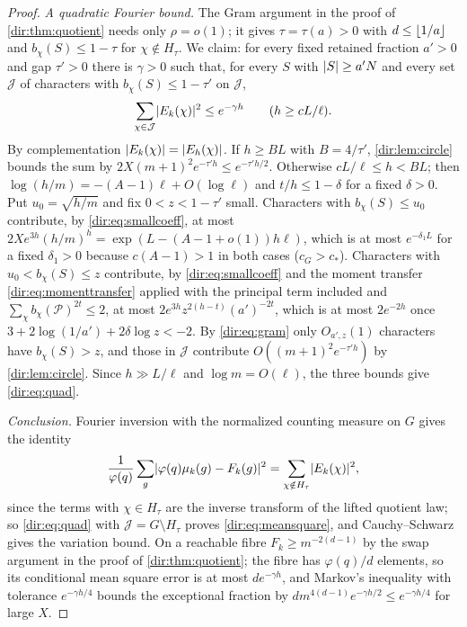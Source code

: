 \begin{proof}
\emph{A quadratic Fourier bound.} The Gram argument in the proof of \cref{dir:thm:quotient} needs only
$\rho=o(1)$; it gives $\tau=\tau(a)>0$ with $d\le\floor{1/a}$ and $b_\chi(S)\le1-\tau$ for
$\chi\notin H_\tau$. We claim: for every fixed retained fraction $a'>0$ and gap $\tau'>0$ there is
$\gamma>0$ such that, for every $S$ with $\abs S\ge a'N$ and every set $\mathcal J$ of characters with
$b_\chi(S)\le1-\tau'$ on $\mathcal J$,
\begin{equation}\label{dir:eq:quad}
 \sum_{\chi\in\mathcal J}\abs{E_k(\chi)}^2\le e^{-\gamma h}\qquad(h\ge cL/\ell).
\end{equation}
By complementation $\abs{E_k(\chi)}=\abs{E_h(\chi)}$. If $h\ge BL$ with $B=4/\tau'$, \cref{dir:lem:circle}
bounds the sum by $2X(m+1)^2e^{-\tau'h}\le e^{-\tau'h/2}$. Otherwise $cL/\ell\le h<BL$; then
$\log(h/m)=-(A-1)\ell+O(\log\ell)$ and $t/h\le1-\delta$ for a fixed $\delta>0$. Put $u_0=\sqrt{h/m}$ and fix
$0<z<1-\tau'$ small. Characters with $b_\chi(S)\le u_0$ contribute, by \eqref{dir:eq:smallcoeff}, at
most $2Xe^{3h}(h/m)^h=\exp(L-(A-1+o(1))h\ell)$, which is at most $e^{-\delta_1L}$ for a fixed
$\delta_1>0$ because $c(A-1)>1$ in both cases ($c_G>c_*$). Characters with $u_0<b_\chi(S)\le z$
contribute, by \eqref{dir:eq:smallcoeff} and the moment transfer \eqref{dir:eq:momenttransfer} applied
with the principal term included and $\sum_\chi b_\chi(\mathcal P)^{2t}\le2$, at most
$2e^{3h}z^{2(h-t)}(a')^{-2t}$, which is at most $2e^{-2h}$ once
$3+2\log(1/a')+2\delta\log z<-2$. By \eqref{dir:eq:gram} only $O_{a',z}(1)$ characters have
$b_\chi(S)>z$, and those in $\mathcal J$ contribute $O((m+1)^2e^{-\tau'h})$ by \cref{dir:lem:circle}.
Since $h\gg L/\ell$ and $\log m=O(\ell)$, the three bounds give \eqref{dir:eq:quad}.

\emph{Conclusion.} Fourier inversion with the normalized counting measure on $G$ gives the identity
\[
 \frac1{\varphi(q)}\sum_g\abs{\varphi(q)\mu_k(g)-F_k(g)}^2=\sum_{\chi\notin H_\tau}\abs{E_k(\chi)}^2,
\]
since the terms with $\chi\in H_\tau$ are the inverse transform of the lifted quotient law; so
\eqref{dir:eq:quad} with $\mathcal J=\widehat G\setminus H_\tau$ proves \eqref{dir:eq:meansquare}, and
Cauchy--Schwarz gives the variation bound. On a reachable fibre $F_k\ge m^{-2(d-1)}$ by the swap argument
in the proof of \cref{dir:thm:quotient}; the fibre has $\varphi(q)/d$ elements, so its conditional mean
square error is at most $de^{-\gamma h}$, and Markov's inequality with tolerance $e^{-\gamma h/4}$ bounds
the exceptional fraction by $dm^{4(d-1)}e^{-\gamma h/2}\le e^{-\gamma h/4}$ for large $X$.
\end{proof}

